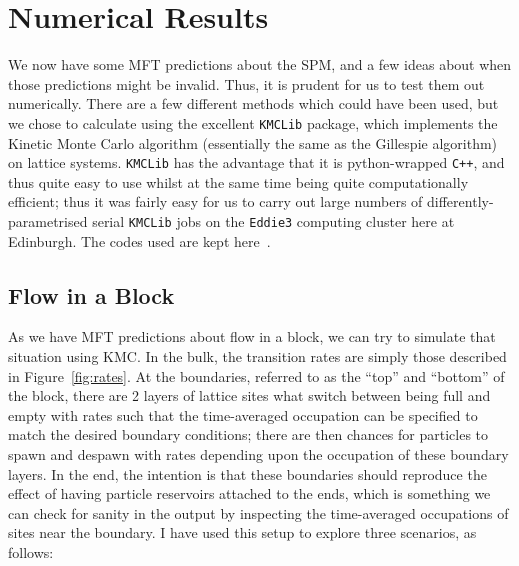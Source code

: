 \section{Numerical Results}
\label{sec:numRes}
We now have some MFT predictions about the SPM, and a few ideas about when those predictions might be invalid. Thus, it is prudent for us to test them out numerically.
There are a few different methods which could have been used, but we chose to calculate using the excellent \texttt{KMCLib}\cite{leetmaa2014kmclib} package, which implements the Kinetic Monte Carlo algorithm (essentially the same as the Gillespie algorithm)
on lattice systems. \texttt{KMCLib} has the advantage that it is python-wrapped \texttt{C++}, and thus quite easy to use whilst at the same time being quite computationally efficient; thus it was fairly easy for us to carry out large numbers
of differently-parametrised serial \texttt{KMCLib} jobs on the \texttt{Eddie3} computing cluster here at Edinburgh. The codes used are kept here~\cite{jHellGitRepo}.
\subsection{Flow in a Block}
As we have MFT predictions about flow in a block, we can try to simulate that situation using KMC. In the bulk, the transition rates are simply those described in Figure~\ref{fig:rates}. At the boundaries, referred to as the ``top'' and ``bottom''
of the block, there are 2 layers of lattice sites what switch between being full and empty with rates such that the time-averaged occupation can be specified to match the desired boundary conditions; there are then chances for particles to spawn
and despawn with rates depending upon the occupation of these boundary layers. In the end, the intention is that these boundaries should reproduce the effect of having particle reservoirs attached to the ends, which is something we can check for
sanity in the output by inspecting the time-averaged occupations of sites near the boundary. I have used this setup to explore three scenarios, as follows:

